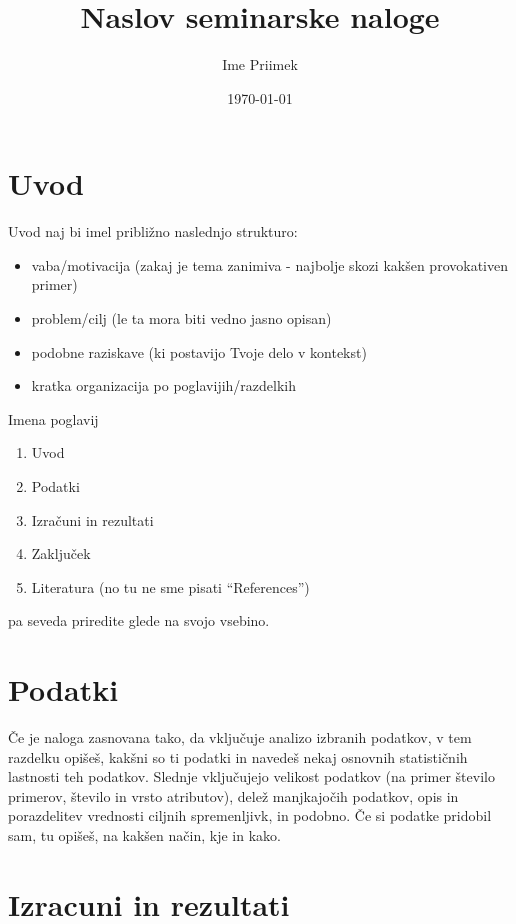 \documentclass[a4paper,11pt]{article}
\title{Naslov seminarske naloge}
\author{Ime Priimek} %
\date{\today}
\begin{document}
\maketitle

\section{Uvod}


Uvod naj bi imel približno naslednjo strukturo:
\begin{itemize}
\item vaba/motivacija (zakaj je tema zanimiva - najbolje skozi
      kakšen provokativen primer)
\item problem/cilj (le ta mora biti vedno jasno opisan)
\item podobne raziskave (ki postavijo Tvoje delo v kontekst)
\item kratka organizacija po poglavijih/razdelkih 
\end{itemize}
%
Imena poglavij 
\begin{enumerate}
\item Uvod
\item Podatki
\item Izračuni in rezultati
\item Zaključek
\item Literatura (no tu ne sme pisati ``References'')
\end{enumerate}
pa seveda priredite glede na svojo vsebino.


\section{Podatki}

Če je naloga zasnovana tako, da vključuje analizo izbranih podatkov, v
tem razdelku opišeš, kakšni so ti podatki in navedeš nekaj osnovnih
statističnih lastnosti teh podatkov. Slednje vključujejo velikost
podatkov (na primer število primerov, število in vrsto atributov), delež
manjkajočih podatkov, opis in porazdelitev vrednosti ciljnih
spremenljivk, in podobno. Če si podatke pridobil sam, tu opišeš, na
kakšen način, kje in kako.

\section{Izracuni in rezultati}
\end{document}
